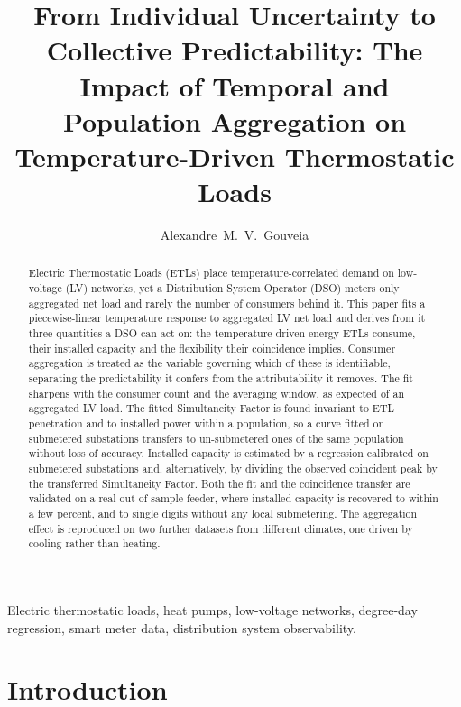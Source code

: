 \documentclass[9pt,journal,a4]{IEEEtran}
\begin{document}
\title{From Individual Uncertainty to Collective Predictability: The Impact of Temporal and Population Aggregation on Temperature-Driven Thermostatic Loads}


\author{Alexandre~M.~V.~Gouveia}

\maketitle

\begin{abstract}
Electric Thermostatic Loads (ETLs) place temperature-correlated demand on low-voltage (LV) networks, yet a Distribution System Operator (DSO) meters only aggregated net load and rarely the number of consumers behind it. This paper fits a piecewise-linear temperature response to aggregated LV net load and derives from it three quantities a DSO can act on: the temperature-driven energy ETLs consume, their installed capacity and the flexibility their coincidence implies. Consumer aggregation is treated as the variable governing which of these is identifiable, separating the predictability it confers from the attributability it removes. The fit sharpens with the consumer count and the averaging window, as expected of an aggregated LV load. The fitted Simultaneity Factor is found invariant to ETL penetration and to installed power within a population, so a curve fitted on submetered substations transfers to un-submetered ones of the same population without loss of accuracy. Installed capacity is estimated by a regression calibrated on submetered substations and, alternatively, by dividing the observed coincident peak by the transferred Simultaneity Factor. Both the fit and the coincidence transfer are validated on a real out-of-sample feeder, where installed capacity is recovered to within a few percent, and to single digits without any local submetering. The aggregation effect is reproduced on two further datasets from different climates, one driven by cooling rather than heating.
\end{abstract}

\begin{IEEEkeywords}
Electric thermostatic loads, heat pumps, low-voltage networks, degree-day regression, smart meter data, distribution system observability.
\end{IEEEkeywords}


\section{Introduction}
\end{document}
